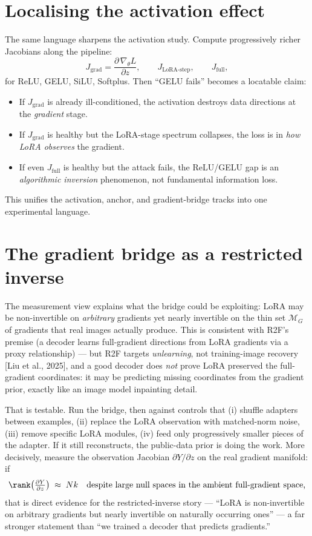 \section{Localising the activation effect}
The same language sharpens the activation study. Compute progressively richer Jacobians
along the pipeline:
\[
J_{\mathrm{grad}}=\frac{\partial\,\nabla_\theta L}{\partial z},\qquad
J_{\text{LoRA-step}},\qquad
J_{\mathrm{full}},
\]
for ReLU, GELU, SiLU, Softplus. Then ``GELU fails'' becomes a locatable claim:
\begin{itemize}\itemsep1pt
\item If $J_{\mathrm{grad}}$ is already ill-conditioned, the activation destroys data
directions at the \emph{gradient} stage.
\item If $J_{\mathrm{grad}}$ is healthy but the LoRA-stage spectrum collapses, the loss is
in \emph{how LoRA observes} the gradient.
\item If even $J_{\mathrm{full}}$ is healthy but the attack fails, the ReLU/GELU gap is an
\emph{algorithmic inversion} phenomenon, not fundamental information loss.
\end{itemize}
This unifies the activation, anchor, and gradient-bridge tracks into one experimental
language.

\section{The gradient bridge as a restricted inverse}
The measurement view explains what the bridge could be exploiting: LoRA may be
non-invertible on \emph{arbitrary} gradients yet nearly invertible on the thin set
$\mathcal M_G$ of gradients that real images actually produce. This is consistent with
R2F's premise (a decoder learns full-gradient directions from LoRA gradients via a proxy
relationship) --- but R2F targets \emph{unlearning}, not training-image recovery
[Liu et al., 2025], and a good decoder does \emph{not} prove LoRA preserved the
full-gradient coordinates: it may be predicting missing coordinates from the gradient
prior, exactly like an image model inpainting detail.

That is testable. Run the bridge, then against controls that (i) shuffle adapters between
examples, (ii) replace the LoRA observation with matched-norm noise, (iii) remove specific
LoRA modules, (iv) feed only progressively smaller pieces of the adapter. If it still
reconstructs, the public-data prior is doing the work. More decisively, measure the
observation Jacobian $\partial Y/\partial z$ on the real gradient manifold: if
\[
\rank\!\left(\tfrac{\partial Y}{\partial z}\right)\;\approx\; Nk
\quad\text{despite large null spaces in the ambient full-gradient space,}
\]
that is direct evidence for the restricted-inverse story --- ``LoRA is non-invertible on
arbitrary gradients but nearly invertible on naturally occurring ones'' --- a far stronger
statement than ``we trained a decoder that predicts gradients.''

